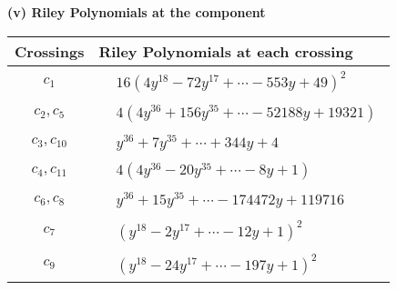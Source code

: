 \documentclass[1p]{elsarticle_modified}
\theoremstyle{definition}
\begin{document}
\flushleft \textbf{(v) Riley Polynomials at the component}\newline \\
\begin{tabular}{m{50pt}|m{274pt}}
Crossings & \hspace{64pt}Riley Polynomials at each crossing \\
\hline $$\begin{aligned}c_{1}\end{aligned}$$&$\begin{aligned}
&16(4 y^{18}-72 y^{17}+\cdots-553 y+49)^{2}
\end{aligned}$\\
\hline $$\begin{aligned}c_{2},c_{5}\end{aligned}$$&$\begin{aligned}
&4(4 y^{36}+156 y^{35}+\cdots-52188 y+19321)
\end{aligned}$\\
\hline $$\begin{aligned}c_{3},c_{10}\end{aligned}$$&$\begin{aligned}
&y^{36}+7 y^{35}+\cdots+344 y+4
\end{aligned}$\\
\hline $$\begin{aligned}c_{4},c_{11}\end{aligned}$$&$\begin{aligned}
&4(4 y^{36}-20 y^{35}+\cdots-8 y+1)
\end{aligned}$\\
\hline $$\begin{aligned}c_{6},c_{8}\end{aligned}$$&$\begin{aligned}
&y^{36}+15 y^{35}+\cdots-174472 y+119716
\end{aligned}$\\
\hline $$\begin{aligned}c_{7}\end{aligned}$$&$\begin{aligned}
&(y^{18}-2 y^{17}+\cdots-12 y+1)^{2}
\end{aligned}$\\
\hline $$\begin{aligned}c_{9}\end{aligned}$$&$\begin{aligned}
&(y^{18}-24 y^{17}+\cdots-197 y+1)^{2}
\end{aligned}$\\
\hline
\end{tabular}\\~\\
\end{document}
